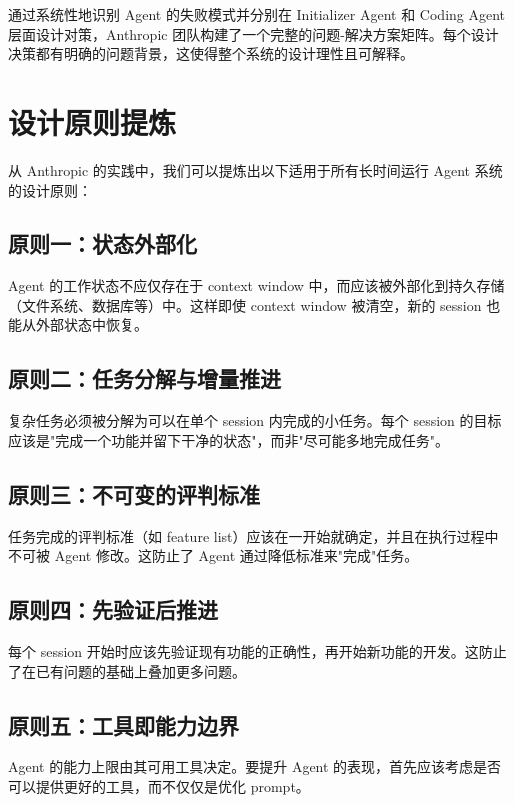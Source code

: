 \documentclass[a4paper]{article}
\begin{document}
通过系统性地识别 Agent 的失败模式并分别在 Initializer Agent 和 Coding Agent 层面设计对策，Anthropic 团队构建了一个完整的问题-解决方案矩阵。每个设计决策都有明确的问题背景，这使得整个系统的设计理性且可解释。


\section{设计原则提炼}

从 Anthropic 的实践中，我们可以提炼出以下适用于所有长时间运行 Agent 系统的设计原则：

\subsection{原则一：状态外部化}

Agent 的工作状态不应仅存在于 context window 中，而应该被外部化到持久存储（文件系统、数据库等）中。这样即使 context window 被清空，新的 session 也能从外部状态中恢复。

\subsection{原则二：任务分解与增量推进}

复杂任务必须被分解为可以在单个 session 内完成的小任务。每个 session 的目标应该是"完成一个功能并留下干净的状态"，而非"尽可能多地完成任务"。

\subsection{原则三：不可变的评判标准}

任务完成的评判标准（如 feature list）应该在一开始就确定，并且在执行过程中不可被 Agent 修改。这防止了 Agent 通过降低标准来"完成"任务。

\subsection{原则四：先验证后推进}

每个 session 开始时应该先验证现有功能的正确性，再开始新功能的开发。这防止了在已有问题的基础上叠加更多问题。

\subsection{原则五：工具即能力边界}

Agent 的能力上限由其可用工具决定。要提升 Agent 的表现，首先应该考虑是否可以提供更好的工具，而不仅仅是优化 prompt。
\end{document}
